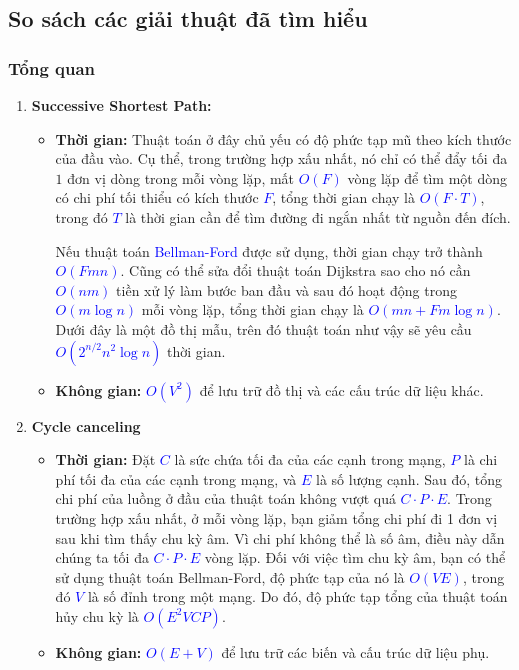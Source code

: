 \documentclass[a4paper]{article}
\begin{document}
\subsection{So sách các giải thuật đã tìm hiểu}
\subsubsection{Tổng quan}
\begin{enumerate}
    \item \textbf{Successive Shortest Path:}
    \begin{itemize}
        \item \textbf{Thời gian:} Thuật toán ở đây chủ yếu có độ phức tạp mũ theo kích thước của đầu vào. Cụ thể, trong trường hợp xấu nhất, nó chỉ có thể đẩy tối đa $1$ đơn vị dòng trong mỗi vòng lặp, mất \textcolor{blue}{$O(F)$} vòng lặp để tìm một dòng có chi phí tối thiểu có kích thước \textcolor{blue}{$F$}, tổng thời gian chạy là \textcolor{blue}{$O(F \cdot T)$}, trong đó \textcolor{blue}{$T$} là thời gian cần để tìm đường đi ngắn nhất từ nguồn đến đích.

        Nếu thuật toán \textcolor{blue}{Bellman-Ford} được sử dụng, thời gian chạy trở thành \textcolor{blue}{$O(Fmn)$}. Cũng có thể sửa đổi thuật toán Dijkstra sao cho nó cần \textcolor{blue}{$O(nm)$} tiền xử lý làm bước ban đầu và sau đó hoạt động trong \textcolor{blue}{$O(m \log n)$} mỗi vòng lặp, tổng thời gian chạy là \textcolor{blue}{$O(mn + F m \log n)$}. Dưới đây là một đồ thị mẫu, trên đó thuật toán như vậy sẽ yêu cầu \textcolor{blue}{$O(2^{n/2} n^2 \log n)$} thời gian.
        

        \item \textbf{Không gian:} \textcolor{blue}{$O(V^2)$} để lưu trữ đồ thị và các cấu trúc dữ liệu khác.
    \end{itemize}
    \item \textbf{Cycle canceling}
    \begin{itemize}
        \item \textbf{Thời gian:} Đặt \textcolor{blue}{\(C\)} là sức chứa tối đa của các cạnh trong mạng, \textcolor{blue}{\(P\)} là chi phí tối đa của các cạnh trong mạng, và \textcolor{blue}{\(E\)} là số lượng cạnh. Sau đó, tổng chi phí của luồng ở đầu của thuật toán không vượt quá \textcolor{blue}{\(C \cdot P \cdot E\)}. Trong trường hợp xấu nhất, ở mỗi vòng lặp, bạn giảm tổng chi phí đi 1 đơn vị sau khi tìm thấy chu kỳ âm. Vì chi phí không thể là số âm, điều này dẫn chúng ta tối đa \textcolor{blue}{\(C \cdot P \cdot E\)} vòng lặp. Đối với việc tìm chu kỳ âm, bạn có thể sử dụng thuật toán Bellman-Ford, độ phức tạp của nó là \textcolor{blue}{\(O(VE)\)}, trong đó \textcolor{blue}{\(V\)} là số đỉnh trong một mạng. Do đó, độ phức tạp tổng của thuật toán hủy chu kỳ là \textcolor{blue}{\(O(E^2VCP)\)}.
        \item \textbf{Không gian:} \textcolor{blue}{$O(E+V)$} để lưu trữ các biến và cấu trúc dữ liệu phụ.

    \end{itemize}
\end{enumerate}
\end{document}
